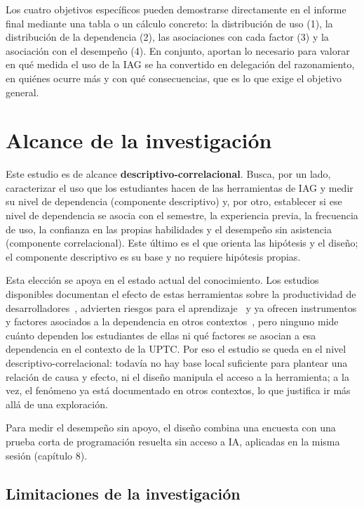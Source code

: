 \documentclass[12pt,letterpaper]{article}
\numberwithin{table}{section}
\numberwithin{figure}{section}
\begin{document}
Los cuatro objetivos específicos pueden demostrarse directamente en el informe final mediante una tabla o un cálculo concreto: la distribución de uso (1), la distribución de la dependencia (2), las asociaciones con cada factor (3) y la asociación con el desempeño (4). En conjunto, aportan lo necesario para valorar en qué medida el uso de la IAG se ha convertido en delegación del razonamiento, en quiénes ocurre más y con qué consecuencias, que es lo que exige el objetivo general.

\section{Alcance de la investigación}

Este estudio es de alcance \textbf{descriptivo-correlacional}. Busca, por un lado, caracterizar el uso que los estudiantes hacen de las herramientas de IAG y medir su nivel de dependencia (componente descriptivo) y, por otro, establecer si ese nivel de dependencia se asocia con el semestre, la experiencia previa, la frecuencia de uso, la confianza en las propias habilidades y el desempeño sin asistencia (componente correlacional). Este último es el que orienta las hipótesis y el diseño; el componente descriptivo es su base y no requiere hipótesis propias.

Esta elección se apoya en el estado actual del conocimiento. Los estudios disponibles documentan el efecto de estas herramientas sobre la productividad de desarrolladores~\cite{peng2023impact,ziegler2024measuring}, advierten riesgos para el aprendizaje~\cite{becker2023programming,prather2024widening,bastani2025generative} y ya ofrecen instrumentos y factores asociados a la dependencia en otros contextos~\cite{moralesgarcia2024development,zhang2024dependency}, pero ninguno mide cuánto dependen los estudiantes de ellas ni qué factores se asocian a esa dependencia en el contexto de la UPTC. Por eso el estudio se queda en el nivel descriptivo-correlacional: todavía no hay base local suficiente para plantear una relación de causa y efecto, ni el diseño manipula el acceso a la herramienta; a la vez, el fenómeno ya está documentado en otros contextos, lo que justifica ir más allá de una exploración.

Para medir el desempeño sin apoyo, el diseño combina una encuesta con una prueba corta de programación resuelta sin acceso a IA, aplicadas en la misma sesión (capítulo 8).

\subsection{Limitaciones de la investigación}
\end{document}
